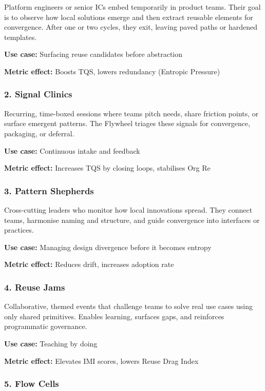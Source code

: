 \documentclass[12pt]{article}
\begin{document}
Platform engineers or senior ICs embed temporarily in product teams. Their goal is to observe how local solutions emerge and then extract reusable elements for convergence. After one or two cycles, they exit, leaving paved paths or hardened templates.

\textbf{Use case:} Surfacing reuse candidates before abstraction

\textbf{Metric effect:} Boosts TQS, lowers redundancy (Entropic Pressure)

\subsubsection*{2. Signal Clinics}

Recurring, time-boxed sessions where teams pitch needs, share friction points, or surface emergent patterns. The Flywheel triages these signals for convergence, packaging, or deferral.

\textbf{Use case:} Continuous intake and feedback

\textbf{Metric effect:} Increases TQS by closing loops, stabilises Org Re

\subsubsection*{3. Pattern Shepherds}

Cross-cutting leaders who monitor how local innovations spread. They connect teams, harmonise naming and structure, and guide convergence into interfaces or practices.

\textbf{Use case:} Managing design divergence before it becomes entropy

\textbf{Metric effect:} Reduces drift, increases adoption rate

\subsubsection*{4. Reuse Jams}

Collaborative, themed events that challenge teams to solve real use cases using only shared primitives. Enables learning, surfaces gaps, and reinforces programmatic governance.

\textbf{Use case:} Teaching by doing

\textbf{Metric effect:} Elevates IMI scores, lowers Reuse Drag Index

\subsubsection*{5. Flow Cells}
\end{document}
